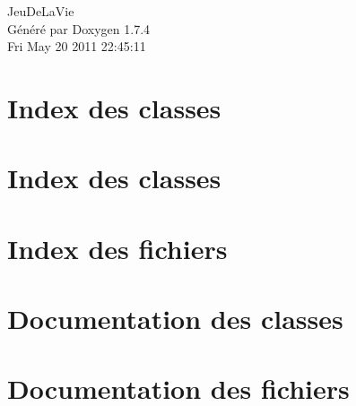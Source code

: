 \documentclass[a4paper]{book}
\begin{document}
\hypersetup{pageanchor=false}
\begin{titlepage}
\vspace*{7cm}
\begin{center}
{\Large JeuDeLaVie }\\
\vspace*{1cm}
{\large Généré par Doxygen 1.7.4}\\
\vspace*{0.5cm}
{\small Fri May 20 2011 22:45:11}\\
\end{center}
\end{titlepage}
\clearemptydoublepage
{}
\tableofcontents
\clearemptydoublepage
{}
\hypersetup{pageanchor=true}
\chapter{Index des classes}

\chapter{Index des classes}

\chapter{Index des fichiers}

\chapter{Documentation des classes}














\chapter{Documentation des fichiers}



































\printindex
\end{document}
